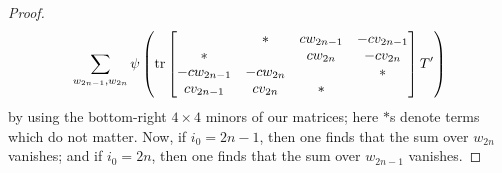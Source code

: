 \begin{proof}
    \[\sum_{w_{2n-1},w_{2n}}\psi\left(\operatorname{tr}\begin{bmatrix}
        & * & cw_{2n-1} & -cv_{2n-1} \\
        * & & cw_{2n} & -cv_{2n} \\
        -cw_{2n-1} & -cw_{2n} & & * \\
        cv_{2n-1} & cv_{2n} & *
    \end{bmatrix}T'\right)\]
    by using the bottom-right $4\times4$ minors of our matrices; here $*$s denote terms which do not matter. Now, if $i_0=2n-1$, then one finds that the sum over $w_{2n}$ vanishes; and if $i_0=2n$, then one finds that the sum over $w_{2n-1}$ vanishes.
\end{proof}
